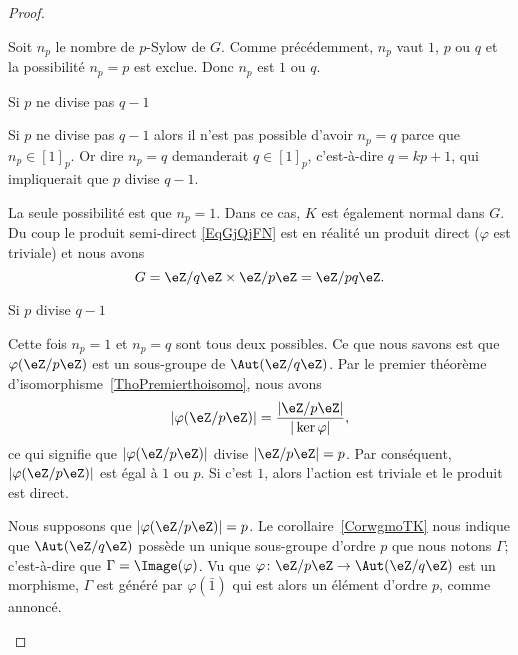 \begin{proof}
\begin{subproof}
        Soit \( n_p\) le nombre de \( p\)-Sylow de \( G\). Comme précédemment, \( n_p\) vaut \( 1\), \( p\) ou \( q\) et la possibilité \( n_p=p\) est exclue. Donc \( n_p\) est \( 1\) ou \( q\).

    \item[Si \( p\) ne divise pas \( q-1\)]

        Si \( p\) ne divise pas \( q-1\) alors il n'est pas possible d'avoir \( n_p=q\) parce que \( n_p\in [1]_p\). Or dire \( n_p=q\) demanderait \( q\in [1]_p\), c'est-à-dire \( q=kp+1\), qui impliquerait que \( p\) divise \( q-1\).

        La seule possibilité est que \( n_p=1\). Dans ce cas, \( K\) est également normal dans \( G\). Du coup le produit semi-direct \eqref{EqGjQjFN} est en réalité un produit direct (\( \varphi\) est triviale) et nous avons
        \begin{equation}
            G=\eZ/q\eZ\times \eZ/p\eZ=\eZ/pq\eZ.
        \end{equation}

    \item[Si \( p\) divise \( q-1\)]

        Cette fois \( n_p=1\) et \( n_p=q\) sont tous deux possibles. Ce que nous savons est que \( \varphi(\eZ/p\eZ)\) est un sous-groupe de \( \Aut(\eZ/q\eZ)\). Par le premier théorème d'isomorphisme~\ref{ThoPremierthoisomo}, nous avons
        \begin{equation}
            | \varphi(\eZ/p\eZ) |=\frac{ | \eZ/p\eZ | }{ | \ker\varphi | },
        \end{equation}
        ce qui signifie que \( | \varphi(\eZ/p\eZ) |\) divise \( | \eZ/p\eZ |=p\). Par conséquent, \( | \varphi(\eZ/p\eZ) |\) est égal à \( 1\) ou \( p\). Si c'est \( 1\), alors l'action est triviale et le produit est direct.

        Nous supposons que \( | \varphi(\eZ/p\eZ) |=p\). Le corollaire~\ref{CorwgmoTK} nous indique que \( \Aut(\eZ/q\eZ)\) possède un unique sous-groupe d'ordre \( p\) que nous notons \( \Gamma\); c'est-à-dire que \( \Gamma=\Image(\varphi)\). Vu que \( \varphi\colon \eZ/p\eZ\to \Aut(\eZ/q\eZ)\) est un morphisme, \( \Gamma\) est généré par \( \varphi(\bar 1)\) qui est alors un élément d'ordre \( p\), comme annoncé.


\end{subproof}
\end{proof}
